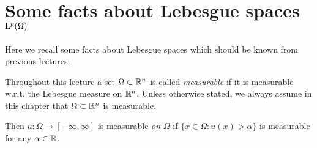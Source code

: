 \chapter{Some facts about Lebesgue spaces \texorpdfstring{$\mathrm{L}^p(\Omega)$}{L\textasciicircum p(Omega)}}

Here we recall some facts about Lebesgue spaces which should be known from previous lectures.

Throughout this lecture a set $\Omega \subset \mathbb{R}^n$ is called \emph{measurable} if it is measurable w.r.t. the Lebesgue measure on $\mathbb{R}^n$.
Unless otherwise stated, we always assume in this chapter that $\Omega \subset \mathbb{R}^n$ is measurable.

Then $u \colon \Omega \to [-\infty,\infty]$ is measurable \emph{on} $\Omega$ if $\{x \in \Omega \colon u(x) > \alpha\}$ is measurable for any $\alpha \in \mathbb{R}$.


